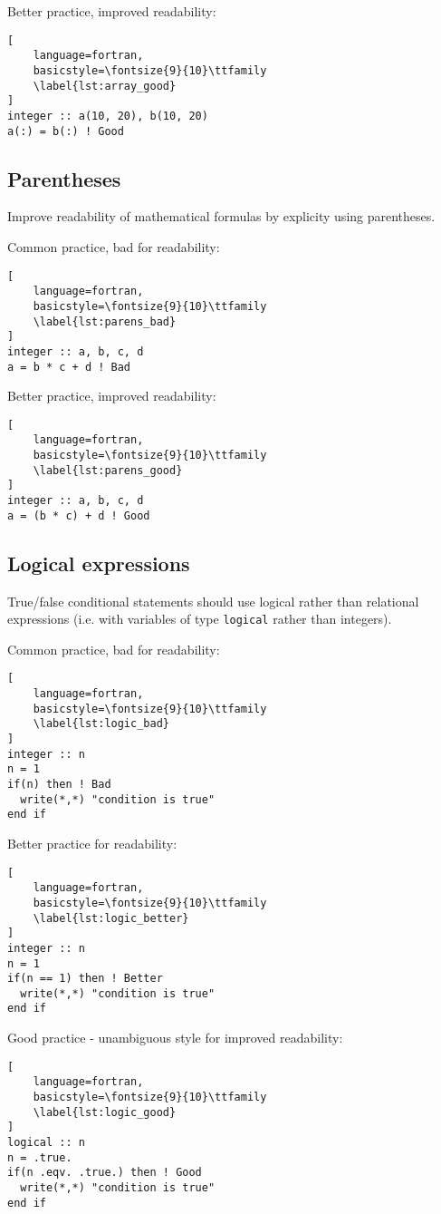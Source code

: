 \documentclass[11pt]{article}
\begin{document}
Better practice, improved readability:
\begin{lstlisting}[
	language=fortran,
    basicstyle=\fontsize{9}{10}\ttfamily
    \label{lst:array_good}
]
integer :: a(10, 20), b(10, 20)
a(:) = b(:) ! Good
\end{lstlisting}

\subsection{Parentheses}
Improve readability of mathematical formulas by explicity using parentheses.

Common practice, bad for readability:
\begin{lstlisting}[
	language=fortran,
    basicstyle=\fontsize{9}{10}\ttfamily
    \label{lst:parens_bad}
]
integer :: a, b, c, d
a = b * c + d ! Bad
\end{lstlisting}

Better practice, improved readability:
\begin{lstlisting}[
	language=fortran,
    basicstyle=\fontsize{9}{10}\ttfamily
    \label{lst:parens_good}
]
integer :: a, b, c, d
a = (b * c) + d ! Good
\end{lstlisting}

\subsection{Logical expressions}
True/false conditional statements should use logical rather than relational expressions (i.e. with variables of 
type \texttt{logical} rather than integers). 

Common practice, bad for readability:
\begin{lstlisting}[
	language=fortran,
    basicstyle=\fontsize{9}{10}\ttfamily
    \label{lst:logic_bad}
]
integer :: n
n = 1
if(n) then ! Bad
  write(*,*) "condition is true"
end if
\end{lstlisting}

Better practice for readability:
\begin{lstlisting}[
	language=fortran,
    basicstyle=\fontsize{9}{10}\ttfamily
    \label{lst:logic_better}
]
integer :: n
n = 1
if(n == 1) then ! Better
  write(*,*) "condition is true"
end if
\end{lstlisting}

Good practice - unambiguous style for improved readability:

\begin{lstlisting}[
	language=fortran,
    basicstyle=\fontsize{9}{10}\ttfamily
    \label{lst:logic_good}
]
logical :: n
n = .true.
if(n .eqv. .true.) then ! Good
  write(*,*) "condition is true"
end if
\end{lstlisting}
\end{document}
